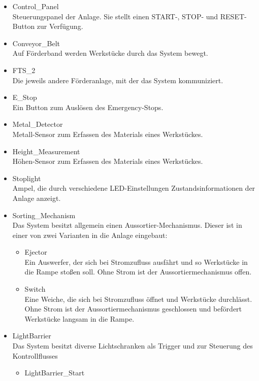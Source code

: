 \begin{itemize}
    \item Control\_Panel\\
    Steuerungspanel der Anlage.
    Sie stellt einen START-, STOP- und RESET-Button zur Verfügung.

    \item Conveyor\_Belt\\
    Auf Förderband werden Werkstücke durch das System bewegt.
    \item FTS\_2\\
    Die jeweils andere Förderanlage, mit der das System kommuniziert.
    \item E\_Stop\\
    Ein Button zum Auslösen des Emergency-Stops.
    \item Metal\_Detector\\
    Metall-Sensor zum Erfassen des Materials eines Werkstückes.
    \item Height\_Measurement\\
    Höhen-Sensor zum Erfassen des Materials eines Werkstückes.
    \item Stoplight\\
    Ampel, die durch verschiedene LED-Einstellungen Zustandsinformationen der Anlage anzeigt.
    \item Sorting\_Mechanism\\
    Das System besitzt allgemein einen Aussortier-Mechanismus.
    Dieser ist in einer von zwei Varianten in die Anlage eingebaut:
    \begin{itemize}
        \item Ejector\\
        Ein Auswerfer, der sich bei Stromzufluss ausfährt und so Werkstücke in die Rampe stoßen soll.
        Ohne Strom ist der Aussortiermechanismus offen.
        \item Switch\\
        Eine Weiche, die sich bei Stromzufluss öffnet und Werkstücke durchlässt.
        Ohne Strom ist der Aussortiermechanismus geschlossen und befördert Werkstücke langsam in die Rampe.
    \end{itemize}
    \item LightBarrier\\
    Das System besitzt diverse Lichtschranken als Trigger und zur Steuerung des Kontrollflusses
    \begin{itemize}
        \item LightBarrier\_Start\\

\end{itemize}
\end{itemize}
